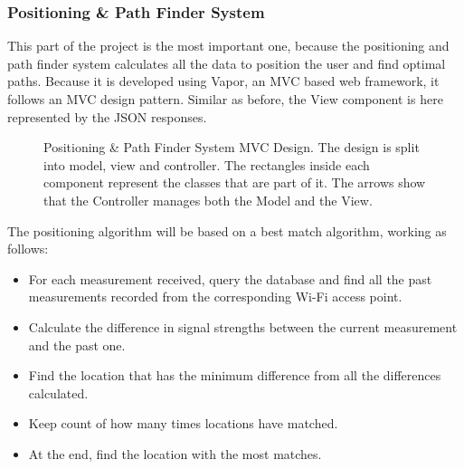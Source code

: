 \subsubsection{Positioning \& Path Finder System}
This part of the project is the most important one, because the positioning and path finder system calculates all the data to position the user and find optimal paths. Because it is developed using Vapor, an MVC based web framework, it follows an MVC design pattern. Similar as before, the View component is here represented by the JSON responses.

\begin{figure}[H]
    \centering
    \centering
    \caption{Positioning \& Path Finder System MVC Design. The design is split into model, view and controller. The rectangles inside each component represent the classes that are part of it. The arrows show that the Controller manages both the Model and the View.}
    \label{fig:pos-nav-mvc}
\end{figure}

The positioning algorithm will be based on a best match algorithm, working as follows:
\begin{itemize}
    \item For each measurement received, query the database and find all the past measurements recorded from the corresponding Wi-Fi access point.
    \item Calculate the difference in signal strengths between the current measurement and the past one.
    \item Find the location that has the minimum difference from all the differences calculated.
    \item Keep count of how many times locations have matched.
    \item At the end, find the location with the most matches.
\end{itemize}

